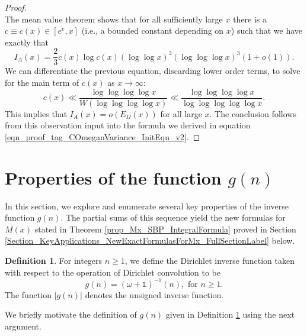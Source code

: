 \documentclass[11pt,reqno,a4letter]{article}
\newcommand{\hlocalref}[1]{\hyperref[#1]{\ref{#1}}}
\numberwithin{equation}{section}
\numberwithin{figure}{section}
\numberwithin{table}{section}
\theoremstyle{plain}
\numberwithin{theorem}{section}
\theoremstyle{definition}
\newtheorem{definition}[theorem]{Definition}
\begin{document}
\begin{proof}
\[\]
The mean value theorem shows that for all sufficiently large $x$ there is a 
$c \equiv c(x) \in [e^e, x]$ (i.e., a bounded constant depending on $x$) such that 
we have exactly that 
\[
I_A(x) = \frac{2}{3} c(x) \log c(x) (\log\log x)^3 (\log\log\log x)^3 (1+o(1)). 
\]
We can differentiate the previous equation, discarding lower order terms, to solve 
for the main term of $c(x)$ as $x \rightarrow \infty$: 
\[
c(x) \ll \frac{\log\log\log\log x}{W\left(\log\log\log\log x\right)} \ll 
	\frac{\log\log\log\log x}{\log\log\log\log\log x}.
\]
This implies that $I_A(x) = o\left(E_{\Omega}(x)\right)$ for all large $x$. 
The conclusion follows from this observation input into the formula we derived in 
equation \eqref{eqn_proof_tag_COmeganVariance_InitEqn_v2}. 
\end{proof}

\section{Properties of the function $g(n)$} 
\label{Section_NewFormulasForgInvn_v2} 

In this section, we explore and enumerate several key properties of the inverse function 
$g(n)$. The partial sums of this sequence yield the new formulas for $M(x)$ stated in 
Theorem \hlocalref{prop_Mx_SBP_IntegralFormula} proved in 
Section \hlocalref{Section_KeyApplications_NewExactFormulasForMx_FullSectionLabel} below. 

\begin{definition}
\label{def_gn_and_Absgn_v2} 
For integers $n \geq 1$, we define the Dirichlet inverse function 
taken with respect to the operation of Dirichlet convolution to be 
\[
g(n) = (\omega + \mathds{1})^{-1}(n), \text{ for } n \geq 1. 
\]
The function $|g(n)|$ denotes the unsigned inverse function. 
\end{definition}

We briefly motivate the definition of $g(n)$ given in 
Definition \hlocalref{def_gn_and_Absgn_v2} using the next argument.
\end{document}
